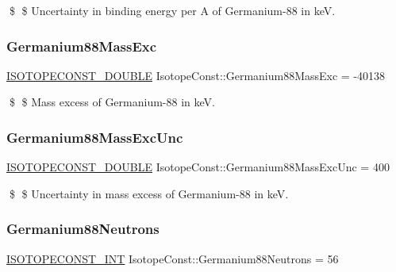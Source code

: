 \$ \$ Uncertainty in binding energy per A of Germanium-\/88 in keV. \mbox{\label{group___isotope_const-_germanium-_ge88_ga4611388040ec487d80b50fa99517de0f}} 
\subsubsection{\texorpdfstring{Germanium88\+Mass\+Exc}{Germanium88MassExc}}
{\footnotesize\ttfamily \mbox{\hyperlink{group___isotope_const-_macros_ga8f45a7272ce02c0b4c65c44636ed719a}{I\+S\+O\+T\+O\+P\+E\+C\+O\+N\+S\+T\+\_\+\+D\+O\+U\+B\+LE}} Isotope\+Const\+::\+Germanium88\+Mass\+Exc = -\/40138}

\$ \$ Mass excess of Germanium-\/88 in keV. \mbox{\label{group___isotope_const-_germanium-_ge88_gafa4f417dee8983157059a18a68a5b4c4}} 
\subsubsection{\texorpdfstring{Germanium88\+Mass\+Exc\+Unc}{Germanium88MassExcUnc}}
{\footnotesize\ttfamily \mbox{\hyperlink{group___isotope_const-_macros_ga8f45a7272ce02c0b4c65c44636ed719a}{I\+S\+O\+T\+O\+P\+E\+C\+O\+N\+S\+T\+\_\+\+D\+O\+U\+B\+LE}} Isotope\+Const\+::\+Germanium88\+Mass\+Exc\+Unc = 400}

\$ \$ Uncertainty in mass excess of Germanium-\/88 in keV. \mbox{\label{group___isotope_const-_germanium-_ge88_gad0ae069857a55ac89ec8db69f98fff0b}} 
\subsubsection{\texorpdfstring{Germanium88\+Neutrons}{Germanium88Neutrons}}
{\footnotesize\ttfamily \mbox{\hyperlink{group___isotope_const-_macros_ga5f18360b3e99483a35c32d789e62621c}{I\+S\+O\+T\+O\+P\+E\+C\+O\+N\+S\+T\+\_\+\+I\+NT}} Isotope\+Const\+::\+Germanium88\+Neutrons = 56}

